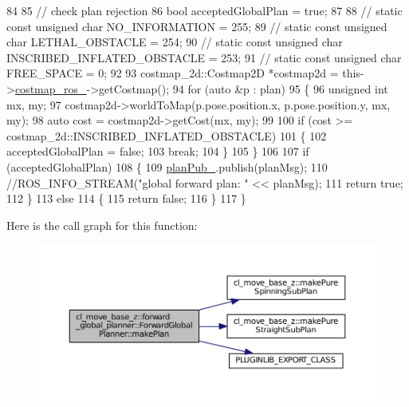 \begin{DoxyCode}
84 
85     \textcolor{comment}{// check plan rejection}
86     \textcolor{keywordtype}{bool} acceptedGlobalPlan = \textcolor{keyword}{true};
87 
88     \textcolor{comment}{// static const unsigned char NO\_INFORMATION = 255;}
89     \textcolor{comment}{// static const unsigned char LETHAL\_OBSTACLE = 254;}
90     \textcolor{comment}{// static const unsigned char INSCRIBED\_INFLATED\_OBSTACLE = 253;}
91     \textcolor{comment}{// static const unsigned char FREE\_SPACE = 0;}
92 
93     costmap\_2d::Costmap2D *costmap2d = this->\hyperlink{classcl__move__base__z_1_1forward__global__planner_1_1ForwardGlobalPlanner_a711d4a0d92a216eb8cab3b42f18eb795}{costmap\_ros\_}->getCostmap();
94     \textcolor{keywordflow}{for} (\textcolor{keyword}{auto} &p : plan)
95     \{
96         \textcolor{keywordtype}{unsigned} \textcolor{keywordtype}{int} mx, my;
97         costmap2d->worldToMap(p.pose.position.x, p.pose.position.y, mx, my);
98         \textcolor{keyword}{auto} cost = costmap2d->getCost(mx, my);
99 
100         \textcolor{keywordflow}{if} (cost >= costmap\_2d::INSCRIBED\_INFLATED\_OBSTACLE)
101         \{
102             acceptedGlobalPlan = \textcolor{keyword}{false};
103             \textcolor{keywordflow}{break};
104         \}
105     \}
106 
107     \textcolor{keywordflow}{if} (acceptedGlobalPlan)
108     \{
109         \hyperlink{classcl__move__base__z_1_1forward__global__planner_1_1ForwardGlobalPlanner_a927dc6a687fac3751033d9736cf8dfcf}{planPub\_}.publish(planMsg);
110         \textcolor{comment}{//ROS\_INFO\_STREAM("global forward plan: " << planMsg);}
111         \textcolor{keywordflow}{return} \textcolor{keyword}{true};
112     \}
113     \textcolor{keywordflow}{else}
114     \{
115         \textcolor{keywordflow}{return} \textcolor{keyword}{false};
116     \}
117 \}
\end{DoxyCode}


Here is the call graph for this function\+:
\nopagebreak
\begin{figure}[H]
\begin{center}
\leavevmode
\includegraphics[width=350pt]{classcl__move__base__z_1_1forward__global__planner_1_1ForwardGlobalPlanner_a9d7c48877a390ca3cc580a7ffa50d316_cgraph}
\end{center}
\end{figure}




